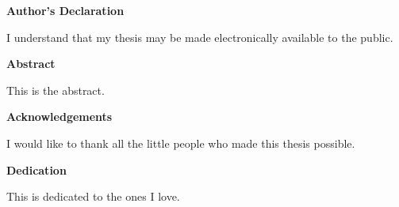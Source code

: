 \cleardoublepage
{}    %

 \begin{center}\textbf{Author's Declaration}\end{center}
  
 \noindent

  \bigskip
  
  \noindent
I understand that my thesis may be made electronically available to the public.

\cleardoublepage
{}    %

\begin{center}\textbf{Abstract}\end{center}

This is the abstract.

\cleardoublepage
{}    %

\begin{center}\textbf{Acknowledgements}\end{center}

I would like to thank all the little people who made this thesis possible.
\cleardoublepage
{}    %

\begin{center}\textbf{Dedication}\end{center}

This is dedicated to the ones I love.
\cleardoublepage
{}    %

\renewcommand\contentsname{Table of Contents}
\tableofcontents
\cleardoublepage
{}    %

